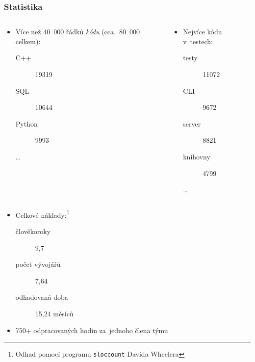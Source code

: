 \documentclass{beamer}
\begin{document}
\begin{frame}[fragile]
\frametitle{Statistika}
\begin{columns}[t]
\begin{column}{.5\textwidth}
\begin{itemize}
    \item Více než 40~000 řádků {\em kódu} (cca.~80~000 celkem):
        \begin{description}
            \item[C++] 19319
            \item[SQL] 10644
            \item[Python] 9993
            \item[\ldots]
        \end{description}
\end{itemize}
\end{column}
\begin{column}{.5\textwidth}
\begin{itemize}
    \item Nejvíce kódu v~testech:
        \begin{description}
            \item[testy] 11072
            \item[CLI] 9672
            \item[server] 8821
            \item[knihovny] 4799
            \item[\ldots]
        \end{description}
\end{itemize}
\end{column}
\end{columns}

\begin{itemize}
    \item Celkové náklady:\footnote{Odhad pomocí programu {\tt sloccount} Davida Wheelera}
        \begin{description}
            \item[člověkoroky] 9,7
            \item[počet vývojářů] 7,64
            \item[odhadovaná doba] 15,24 měsíců
        \end{description}
    \item 750+ odpracovaných hodin za~jednoho člena týmu
\end{itemize}
\end{frame}
\end{document}
